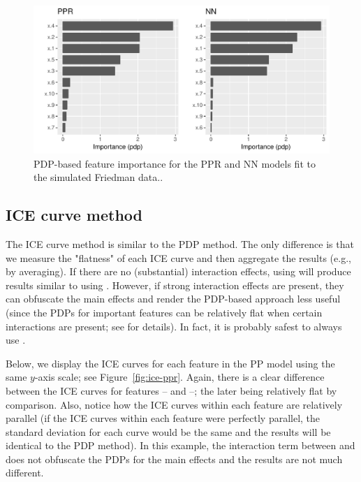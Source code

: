 \begin{figure}[!htb]
  \centering 
  \includegraphics[width=1\linewidth]{figures/vip-ppr-nn} 
  \caption{PDP-based feature importance for the PPR and NN models fit to the simulated Friedman data..}
  \label{fig:pdp-ppr-nn}
\end{figure}


\subsection{ICE curve method}

The ICE curve method is similar to the PDP method. The only difference is that we measure the "flatness" of each ICE curve and then aggregate the results (e.g., by averaging). If there are no (substantial) interaction effects, using  will produce results similar to using . However, if strong interaction effects are present, they can obfuscate the main effects and render the PDP-based approach less useful (since the PDPs for important features can be relatively flat when certain interactions are present; see \citet{goldstein-peeking-2015} for details). In fact, it is probably safest to always use .

Below, we display the ICE curves for each feature in the PP model using the same $y$-axis scale; see Figure~\ref{fig:ice-ppr}. Again, there is a clear difference between the ICE curves for features -- and --; the later being relatively flat by comparison. Also, notice how the ICE curves within each feature are relatively parallel (if the ICE curves within each feature were perfectly parallel, the standard deviation for each curve would be the same and the results will be identical to the PDP method). In this example, the interaction term between  and  does not obfuscate the PDPs for the main effects and the results are not much different.

